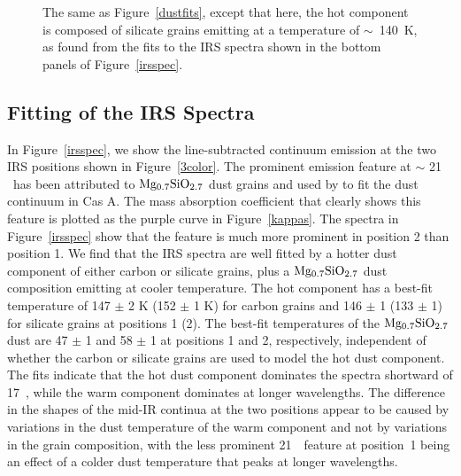 \documentclass{emulateapj}
\begin{document}
\begin{figure*}
\center
{} 
 
 
 
 
 
\caption{\label{dustfits2}The same as Figure~\ref{dustfits}, except that here, the hot component is composed of silicate grains emitting at a temperature of $\sim$~140~K, as found from the fits to the IRS spectra shown in the bottom panels of Figure~\ref{irsspec}.}
\end{figure*}


\subsection{Fitting of the IRS Spectra}\label{specfit}

In Figure~\ref{irsspec}, we show the line-subtracted continuum emission at the two IRS positions shown in Figure~\ref{3color}. The prominent emission feature at $\sim$ 21 \micron\ has been attributed to $\rm Mg_{0.7}SiO_{2.7}$ dust grains \citep{jager03} and used by \citet{arendt14} to fit the dust continuum in Cas A. The mass absorption coefficient that clearly shows this feature is plotted as the purple curve in Figure~\ref{kappas}. The spectra in Figure~\ref{irsspec} show that the feature is much more prominent in position 2 than position 1. We find that the IRS spectra are well fitted by a hotter dust component of either carbon or silicate grains, plus a $\rm Mg_{0.7}SiO_{2.7}$ dust composition emitting at cooler temperature. The hot component has a best-fit temperature of 147 $\pm$ 2 K (152 $\pm$ 1 K) for carbon grains and 146 $\pm$ 1 (133 $\pm$ 1) for silicate grains at positions 1 (2). The best-fit temperatures of the $\rm Mg_{0.7}SiO_{2.7}$ dust are 47 $\pm$ 1 and 58 $\pm$ 1 at positions 1 and 2, respectively, independent of whether the carbon or silicate grains are used to model the hot dust component.
The fits indicate that the hot dust component dominates the spectra shortward of 17~\micron, while the warm component dominates at longer wavelengths. The difference in the shapes of the mid-IR continua at the two positions appear to be caused by variations in the dust temperature of the warm component and not by variations in the grain composition, with the less prominent 21~\micron\ feature at position~1 being an effect of a colder dust temperature that peaks at longer wavelengths.
\end{document}
